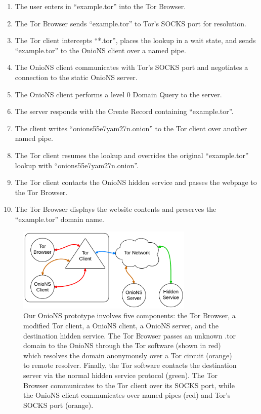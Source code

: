 \begin{enumerate}
	\item The user enters in ``example.tor'' into the Tor Browser.
	\item The Tor Browser sends ``example.tor'' to Tor's SOCKS port for resolution.
	\item The Tor client intercepts ``*.tor'', places the lookup in a wait state, and sends ``example.tor'' to the OnioNS client over a named pipe.
	\item The OnioNS client communicates with Tor's SOCKS port and negotiates a connection to the static OnioNS server.
	\item The OnioNS client performs a level 0 Domain Query to the server.
	\item The server responds with the Create Record containing ``example.tor''.
	\item The client writes ``onions55e7yam27n.onion'' to the Tor client over another named pipe.
	\item The Tor client resumes the lookup and overrides the original ``example.tor'' lookup with ``onions55e7yam27n.onion''.
	\item The Tor client contacts the OnioNS hidden service and passes the webpage to the Tor Browser.
	\item The Tor Browser displays the website contents and preserves the ``example.tor'' domain name.
\end{enumerate}

\begin{figure}[htbp]
	\centering
	\includegraphics[width=0.75\textwidth]{images/LucidCharts/OnioNS_Prototype.pdf}
	\caption{Our OnioNS prototype involves five components: the Tor Browser, a modified Tor client, a OnioNS client, a OnioNS server, and the destination hidden service. The Tor Browser passes an unknown .tor domain to the OnioNS through the Tor software (shown in red) which resolves the domain anonymously over a Tor circuit (orange) to remote resolver. Finally, the Tor software contacts the destination server via the normal hidden service protocol (green). The Tor Browser communicates to the Tor client over its SOCKS port, while the OnioNS client communicates over named pipes (red) and Tor's SOCKS port (orange).}
	\label{fig:prototypeDiagram}
\end{figure}

